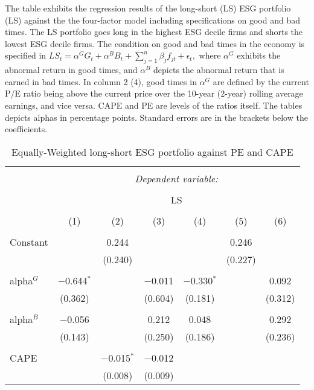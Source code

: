 \documentclass[11pt]{article}
\newcommand\fnote[1]{\captionsetup{font=small}\caption*{#1}}
\begin{document}
\begin{table}[!htbp] \centering 
	\caption{Equally-Weighted long-short ESG portfolio against PE and CAPE} 
	\fnote{The table exhibits the regression results of the long-short (LS) ESG portfolio (LS) against the the four-factor model including specifications on good and bad times. The LS portfolio goes long in the highest ESG decile firms and shorts the lowest ESG decile firms. The condition on good and bad times in the economy is specified in $LS_{t} = \alpha^G G_t + \alpha^B B_t + \sum_{j=1}^{n} \beta_{j} f_{jt} + \epsilon_{t},$ where $\alpha^G$ exhibits the abnormal return in good times, and $\alpha^B$ depicts the abnormal return that is earned in bad times. In column 2 (4), good times in $\alpha^G$ are defined by the current P/E ratio being above the current price over the 10-year (2-year) rolling average earnings, and vice versa. CAPE and PE are levels of the ratios itself. The tables depicts alphas in percentage points. Standard errors are in the brackets below the coefficients.}
	\label{tab:PEandCAPEexplanatory} 
	\begin{tabular*}{\textwidth}{l @{\extracolsep{\fill}} cccccc}
		\\[-1.8ex]\hline 
		\hline \\[-1.8ex] 
		& \multicolumn{6}{c}{\textit{Dependent variable:}} \\ 
		\cline{2-7} 
		\\[-1.8ex] & \multicolumn{6}{c}{LS} \\ 
		\\[-1.8ex] & (1) & (2) & (3) & (4) & (5) & (6)\\ 
		\hline \\[-1.8ex] 
		Constant &  & 0.244 &  &  & 0.246 &  \\ 
		&  & (0.240) &  &  & (0.227) &  \\ 
		& & & & & & \\ 
		alpha$^G$ & $-$0.644$^{*}$ &  & $-$0.011 & $-$0.330$^{*}$ &  & 0.092 \\ 
		& (0.362) &  & (0.604) & (0.181) &  & (0.312) \\ 
		& & & & & & \\ 
		alpha$^B$ & $-$0.056 &  & 0.212 & 0.048 &  & 0.292 \\ 
		& (0.143) &  & (0.250) & (0.186) &  & (0.236) \\ 
		& & & & & & \\ 
		CAPE &  & $-$0.015$^{*}$ & $-$0.012 &  &  &  \\ 
		&  & (0.008) & (0.009) &  &  &  \\ 

\end{tabular*}
\end{table}
\end{document}
